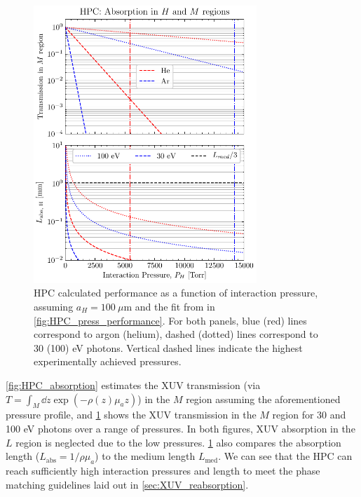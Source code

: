 \begin{figure}
	\centering
	\includegraphics[width=0.75\textwidth]{figures/chap3/HPC-gas-flow-int-length.pdf}
	\caption{HPC calculated performance as a function of interaction pressure, assuming $a_H = 100 \ \mu \textrm{m}$ and the fit from in  \cref{fig:HPC_press_performance}. For both panels, blue (red) lines correspond to argon (helium), dashed (dotted) lines correspond to 30 (100) eV photons. Vertical dashed lines indicate the highest experimentally achieved pressures.}
	\label{fig:HPC-gas-flow-int-length}
\end{figure}

\cref{fig:HPC_absorption} estimates the XUV transmission (via $T = \int_M \dd{z} \exp (- \rho(z) \mu_a z )$) in the $M$ region assuming the aforementioned pressure profile, and \cref{fig:HPC-gas-flow-int-length} shows the XUV transmission in the $M$ region for 30 and 100 eV photons over a range of pressures. In both figures, XUV absorption in the $L$ region is neglected due to the low pressures. \cref{fig:HPC-gas-flow-int-length} also compares the absorption length ($L_{\textrm{abs}} = 1 / \rho \mu_a$) to the medium length $L_{\textrm{med}}$. We can see that the HPC can reach sufficiently high interaction pressures and length to meet the phase matching guidelines laid out in \cref{sec:XUV_reabsorption}.

